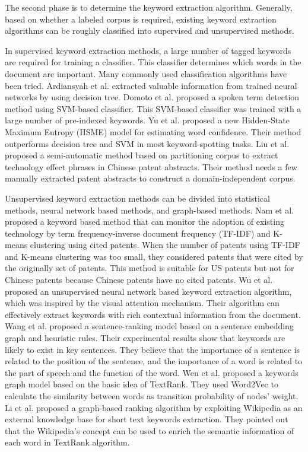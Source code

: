 \documentclass[conference]{IEEEtran}
\begin{document}
\begin{CJK}{UTF8}{gbsn}
	The second phase is to determine the keyword extraction algorithm. Generally, based on whether a labeled corpus is required, existing keyword extraction algorithms can be roughly classified into supervised and unsupervised methods.
	
	In supervised keyword extraction methods, a large number of tagged keywords are required for training a classifier. This classifier determines which words in the document are important. Many commonly used classification algorithms have been tried. Ardiansyah et al. \cite{b15} extracted valuable information from trained neural networks by using decision tree. Domoto et al. \cite{b16} proposed a spoken term detection method using SVM-based classifier. This SVM-based classifier was trained with a large number of pre-indexed keywords. Yu et al. \cite{b17} proposed a new Hidden-State Maximum Entropy (HSME) model for estimating word confidence. Their method outperforms decision tree and SVM in most keyword-spotting tasks. Liu et al. \cite{b18} proposed a semi-automatic method based on partitioning corpus to extract technology effect phrases in Chinese patent abstracts. Their method needs a few manually extracted patent abstracts to construct a domain-independent corpus.
	
	Unsupervised keyword extraction methods can be divided into statistical methods, neural network based methods, and graph-based methods. Nam et al. \cite{b19} proposed a keyword based method that can monitor the adoption of existing technology by term frequency-inverse document frequency (TF-IDF) and K-means clustering using cited patents. When the number of patents using TF-IDF and K-means clustering was too small, they considered patents that were cited by the originally set of patents. This method is suitable for US patents but not for Chinese patents because Chinese patents have no cited patents. Wu et al. \cite{b20} proposed an unsupervised neural network based keyword extraction algorithm, which was inspired by the visual attention mechanism. Their algorithm can effectively extract keywords with rich contextual information from the document. Wang et al. \cite{b21} proposed a sentence-ranking model based on a sentence embedding graph and heuristic rules. Their experimental results show that keywords are likely to exist in key sentences. They believe that the importance of a sentence is related to the position of the sentence, and the importance of a word is related to the part of speech and the function of the word. Wen et al. \cite{b22} proposed a keywords graph model based on the basic idea of TextRank. They used Word2Vec to calculate the similarity between words as transition probability of nodes' weight. Li et al. \cite{b23} proposed a graph-based ranking algorithm by exploiting Wikipedia as an external knowledge base for short text keywords extraction. They pointed out that the Wikipedia's concept can be used to enrich the semantic information of each word in TextRank algorithm.
	

\end{CJK}
\end{document}
